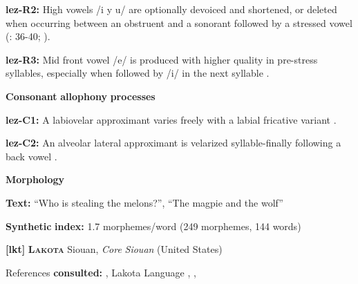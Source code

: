 \begin{styleBody}
\textbf{lez-R2:} High vowels /i y u/ are optionally devoiced and shortened, or deleted when occurring between an obstruent and a sonorant followed by a stressed vowel (\citealt{Haspelmath1993}: 36-40; \citealt{ChitoranBabaliyeva2007}).
\end{styleBody}

\begin{styleBody}
\textbf{lez-R3:} Mid front vowel /e/ is produced with higher quality in pre-stress syllables, especially when followed by /i/ in the next syllable \citep[32]{Haspelmath1993}.
\end{styleBody}

\begin{styleBody}
\textbf{Consonant} \textbf{allophony} \textbf{processes}
\end{styleBody}

\begin{styleBody}
\textbf{lez-C1:} A labiovelar approximant varies freely with a labial fricative variant \citep[35]{Haspelmath1993}.
\end{styleBody}

\begin{styleBody}
\textbf{lez-C2:} An alveolar lateral approximant is velarized syllable-finally following a back vowel \citep[35]{Haspelmath1993}.
\end{styleBody}

\begin{styleBody}
\textbf{Morphology}
\end{styleBody}

\begin{styleBody}
\textbf{Text:} “Who is stealing the melons?”, “The magpie and the wolf” \citep[448-456]{Haspelmath1993}
\end{styleBody}

\begin{styleBody}
\textbf{Synthetic} \textbf{index:} 1.7 morphemes/word (249 morphemes, 144 words)
\end{styleBody}

\begin{styleBody}
\textbf{[lkt]}   \textbf{\textsc{Lakota}}    Siouan, \textit{Core} \textit{Siouan} (United States)
\end{styleBody}

\begin{styleBody}
References \textbf{consulted:} \citet{Ingham2003}, Lakota Language \citet{Consortium2008}, \citet{Mirzayan2010}, \citet{RoodTaylor1996}
\end{styleBody}

